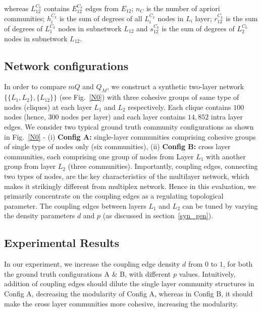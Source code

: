 whereas $L^{C_k}_{12}$ contains $E^{C_k}_{12}$ edges from $E_{12}$;
$n_C$ is the number of apriori communities; $h^{C_k}_i$ is the sum of degrees of all $L^{C_k}_i$ nodes in $L_i$ layer;
$r^{C_k}_{12}$ is the sum of degrees of $L^{C_k}_1$ nodes in subnetwork $L_{12}$ and $s^{C_k}_{12}$ is the sum of
degrees of $L^{C_k}_2$ nodes in subnetwork $L_{12}$.

\subsection{Network configurations}
In order to compare $mQ$ and $Q_M$, we construct a synthetic two-layer network $\{\{L_1, L_2\}, \{L_{12}\}\}$ (see Fig.~\ref{N0}) with
three cohesive groups of same type of nodes (cliques) at each
layer $L_1$ and $L_2$ respectively. Each clique contains $100$ nodes (hence, $300$ nodes per layer) and each layer contains 
$14,852$ intra layer edges.
We consider two typical ground truth community configurations
as shown in Fig.~\ref{N0} - (i) \textbf{Config A:} single-layer communities comprising cohesive groups of single type of nodes
only (six communities),
(ii) \textbf{Config B:} cross layer communities, each comprising one group of nodes from Layer $L_1$ with another group from
layer $L_2$ (three communities). Importantly, coupling edges, connecting two types of nodes, are the key characteristics of
the multilayer network, which makes it strikingly different from multiplex network. Hence in this evaluation, we primarily
concentrate on the coupling edges as a regulating topological parameter.
The coupling edges between layers $L_1$ and $L_2$ can be tuned by varying the density parameters $d$ and $p$ (as discussed in 
section~\ref{syn_gen}).



\subsection{Experimental Results}
In our experiment, we increase the coupling edge density $d$ from $0$ to $1$, for both the ground truth configurations A \& B,
with different $p$ values.
Intuitively, addition of coupling edges should dilute the single layer community structures in Config A, decreasing the
modularity of Config A, whereas in Config B, it should make the cross layer
communities more cohesive, increasing the modularity.


